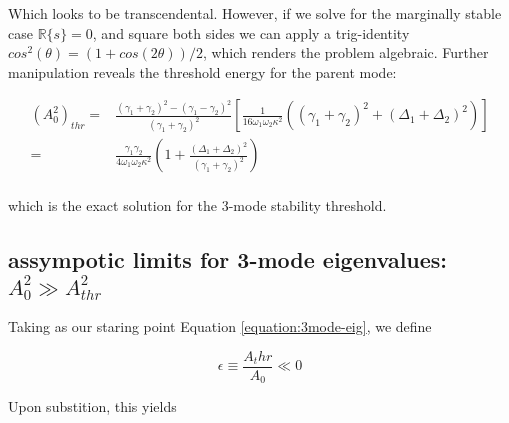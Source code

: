 Which looks to be transcendental. However, if we solve for the marginally stable case $\mathbb{R}\{s\} = 0$, and square both sides we can apply a trig-identity $cos^2(\theta) = (1+cos(2\theta))/2$, which renders the problem algebraic. Further manipulation reveals the threshold energy for the parent mode:

\begin{subequations}\label{equation:3mode Athr}
\begin{align}
(A_0^2)_{thr} = & \frac{(\gamma_1+\gamma_2)^2 - (\gamma_1-\gamma_2)^2}{(\gamma_1+\gamma_2)^2}\left[\frac{1}{16\omega_1\omega_2\kappa^2}\left( (\gamma_1+\gamma_2)^2 + (\Delta_1+\Delta_2)^2\right) \right] \\
              = & \frac{\gamma_1\gamma_2}{4\omega_1\omega_2\kappa^2}\left( 1 + \frac{(\Delta_1+\Delta_2)^2}{(\gamma_1+\gamma_2)^2}\right) \\
\end{align}
\end{subequations}

which is the exact solution for the 3-mode stability threshold.

\subsection*{assympotic limits for 3-mode eigenvalues: $A_0^2 \gg A_{thr}^2$}

Taking as our staring point Equation \ref{equation:3mode-eig}, we define 

\begin{equation}
\epsilon \equiv \frac{A_thr}{A_0} \ll 0
\end{equation}

Upon substition, this yields

